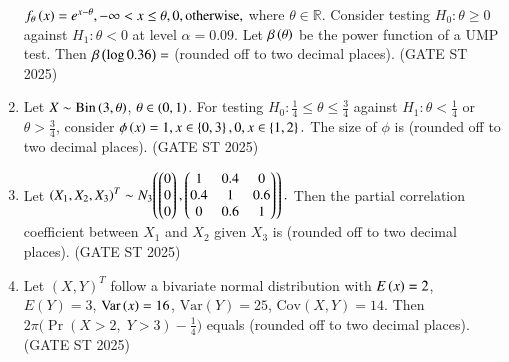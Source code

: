 \documentclass[journal,12pt,onecolumn]{IEEEtran}
\theoremstyle{remark}
\begin{document}
\begin{enumerate}
$
f_\theta\left(x\right)=
e^{x-\theta},  -\infty < x \leq \theta, \\
0,  \text{otherwise},
$
where $\theta\in\mathbb{R}$. Consider testing $H_0:\theta\geq 0$ against $H_1:\theta<0$ at level $\alpha=0.09$. Let $\beta\left(\theta\right)$ be the power function of a UMP test. Then $\beta\left(\log 0.36\right)=$ \underline{\phantom{imagine}} (rounded off to two decimal places).
\hfill{(GATE ST 2025)}
\item Let $X\sim \text{Bin}\left(3,\theta\right)$, $\theta\in\left(0,1\right)$. For testing  
$H_0:\tfrac{1}{4}\leq \theta \leq \tfrac{3}{4}$ against $H_1:\theta<\tfrac{1}{4}$ or $\theta>\tfrac{3}{4}$, consider
$
\phi\left(x\right)=
1,  x\in\left\{0,3\right\}, \\
0,  x\in\left\{1,2\right\}.
$
The size of $\phi$ is \underline{\phantom{imagine}} (rounded off to two decimal places).
\hfill{(GATE ST 2025)}
\item Let $\left(X_1,X_2,X_3\right)^T \sim N_3\!\left(\begin{pmatrix}0\\0\\0\end{pmatrix},
\begin{pmatrix}
1 & 0.4 & 0 \\
0.4 & 1 & 0.6 \\
0 & 0.6 & 1
\end{pmatrix}\right).
$
Then the partial correlation coefficient between $X_1$ and $X_2$ given $X_3$ is \underline{\phantom{imagine}} (rounded off to two decimal places).
\hfill{(GATE ST 2025)}
\item Let $(X,Y)^T$ follow a bivariate normal distribution with $E\left(x\right)=2$, $E(Y)=3$, $\text{Var}\left(x\right)=16$, $\text{Var}(Y)=25$, $\text{Cov}(X,Y)=14$. Then
$
2\pi\Big(\Pr(X>2,\;Y>3)-\tfrac{1}{4}\Big)
$
equals \underline{\phantom{imagine}} (rounded off to two decimal places).
\hfill{(GATE ST 2025)}
\end{enumerate}
\end{document}
